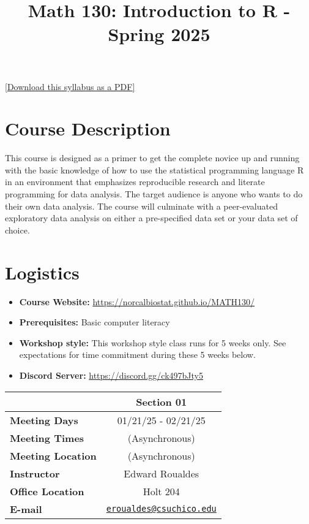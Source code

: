 \documentclass[
  11pt,
]{article}
\title{Math 130: Introduction to R - Spring 2025}
\author{}
\date{\vspace{-2.5em}}
\providecommand{\tightlist}{%
  \setlength{\itemsep}{0pt}\setlength{\parskip}{0pt}}
\begin{document}
\maketitle

\href{syllabus.pdf}{{[}Download this syllabus as a PDF{]}}

\section{Course Description}\label{course-description}

This course is designed as a primer to get the complete novice up and
running with the basic knowledge of how to use the statistical
programming language R in an environment that emphasizes reproducible
research and literate programming for data analysis. The target audience
is anyone who wants to do their own data analysis. The course will
culminate with a peer-evaluated exploratory data analysis on either a
pre-specified data set or your data set of choice.

\section{Logistics}\label{logistics}

\begin{itemize}
\tightlist
\item
  \textbf{Course Website:}
  \url{https://norcalbiostat.github.io/MATH130/}
\item
  \textbf{Prerequisites:} Basic computer literacy
\item
  \textbf{Workshop style:} This workshop style class runs for 5 weeks
  only. See expectations for time commitment during these 5 weeks below.
\item
  \textbf{Discord Server:} \url{https://discord.gg/ck497bJty5}
\end{itemize}

\begin{longtable}[]{@{}lc@{}}
\toprule\noalign{}
& Section 01 \\
\midrule\noalign{}
\endhead
\bottomrule\noalign{}
\endlastfoot
\textbf{Meeting Days} & 01/21/25 - 02/21/25 \\
\textbf{Meeting Times} & (Asynchronous) \\
\textbf{Meeting Location} & (Asynchronous) \\
\textbf{Instructor} & Edward Roualdes \\
\textbf{Office Location} & Holt 204 \\
\textbf{E-mail} &
\href{mailto:eroualdes@csuchico.edu}{\nolinkurl{eroualdes@csuchico.edu}} \\
\end{longtable}
\end{document}
